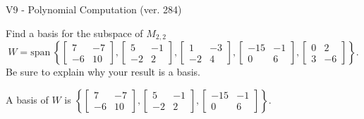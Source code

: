 \begin{exercise}
  \begin{exerciseTitle}V9 - Polynomial Computation (ver. 284)\end{exerciseTitle}
  \begin{exerciseStatement}
    Find a basis for the subspace of \(M_{2,2}\) 
\[W=\mathrm{span}\ \left\{\left[\begin{array}{cc}
7 & -7 \\
-6 & 10
\end{array}\right] , \left[\begin{array}{cc}
5 & -1 \\
-2 & 2
\end{array}\right] , \left[\begin{array}{cc}
1 & -3 \\
-2 & 4
\end{array}\right] , \left[\begin{array}{cc}
-15 & -1 \\
0 & 6
\end{array}\right] , \left[\begin{array}{cc}
0 & 2 \\
3 & -6
\end{array}\right]\right\}.\]
 Be sure to explain why your result is a basis.


  \end{exerciseStatement}
  \begin{exerciseAnswer}
   A basis of \(W\) is  \(\left\{\left[\begin{array}{cc}
7 & -7 \\
-6 & 10
\end{array}\right] , \left[\begin{array}{cc}
5 & -1 \\
-2 & 2
\end{array}\right] , \left[\begin{array}{cc}
-15 & -1 \\
0 & 6
\end{array}\right]\right\}\).
  


  \end{exerciseAnswer}
\end{exercise}